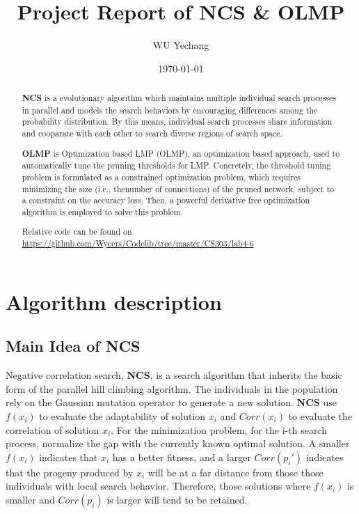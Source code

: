 \documentclass[lang=en,12pt]{elegantpaper}
\title{Project Report of NCS \& OLMP}
\author{WU Yechang}
\institute{11711918}
\date{\today}
\begin{document}
\maketitle

\begin{abstract}

\textbf{NCS} is a evolutionary algorithm which maintains multiple individual search processes in parallel and models the search behaviors by encouraging differences among the probability distribution.
By this means, individual search processes share information and cooparate with each other to search diverse regions of search space.

\textbf{OLMP} is Optimization based LMP (OLMP), an optimization based approach, used to automatically tune the pruning thresholds for LMP.
Concretely, the threshold tuning problem is formulated as a constrained optimization problem, which requires minimizing the size (i.e., thenumber of connections) of the pruned network, subject to a constraint on the accuracy loss. Then, a powerful derivative free optimization algorithm is employed to solve this problem.

Relative code can be found on \href{https://github.com/Wycers/Codelib/tree/master/CS303/lab4-6}{https://github.com/Wycers/Codelib/tree/master/CS303/lab4-6}
\end{abstract}


\section{Algorithm description}
\subsection{Main Idea of NCS}
Negative correlation search, \textbf{NCS}, is a search algorithm that inherits the basic form of the parallel hill climbing algorithm.
The individuals in the population rely on the Gaussian mutation operator to generate a new solution.
\textbf{NCS} use $f(x_i)$ to evaluate the adaptability of solution $x_i$ and $Corr(x_i)$ to evaluate the correlation of solution $x_i$.
For the minimization problem, for the i-th search process, normalize the gap with the currently known optimal solution.
A smaller $f(x_i)$ indicates that $x_i$ has a better fitness,
and a larger $Corr(p_i')$ indicates that the progeny produced by $x_i$ will be at a far distance from those those individuals with local search behavior.
Therefore, those solutions where $f(x_i)$ is smaller and $Corr(p_i)$ is larger will tend to be retained.
\end{document}
